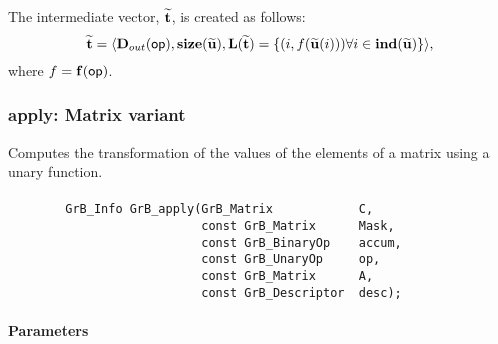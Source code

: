 The intermediate vector, ${\bf \widetilde{t}}$, is created as follows:
\[
{\bf \widetilde{t}} = \langle
\mbox{$\mathbf{D}_{out}$}({\sf op}), \bold{size}({\bf \widetilde{u}}),
\bold{L}({\bf \widetilde{t}}) =
\{(i,f({\bf \widetilde{u}}(i))) \forall i \in \bold{ind}({\bf \widetilde{u}}) \} \rangle, 
\]
where $f = \mathbf{f}({\sf op})$.







\subsubsection{{\sf apply}: Matrix variant}
Computes the transformation of the values of the elements of a matrix using a unary function.

\paragraph{\syntax}

\begin{verbatim}
        GrB_Info GrB_apply(GrB_Matrix            C,
                           const GrB_Matrix      Mask,
                           const GrB_BinaryOp    accum,
                           const GrB_UnaryOp     op,
                           const GrB_Matrix      A,
                           const GrB_Descriptor  desc);
\end{verbatim}

\paragraph{Parameters}

